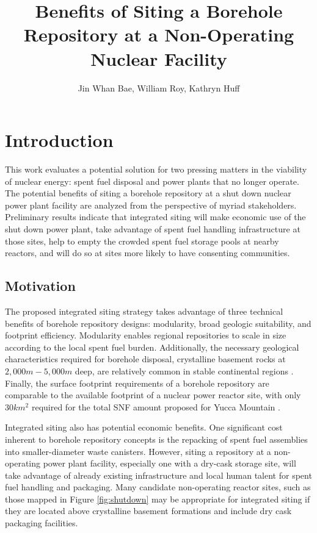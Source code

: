 \documentclass{anstrans}
\title{Benefits of Siting a Borehole Repository at a Non-Operating Nuclear 
Facility}
\author{Jin Whan Bae, William Roy, Kathryn Huff}
\institute{
Dept. of Nuclear Plasma, and Radiological Engineering, University of Illinois at Urbana-Champaign
\and
Urbana, IL
}
\begin{document}
\section{Introduction}

This work evaluates a potential solution for two pressing matters in the viability of
nuclear energy: spent fuel disposal and power plants that no longer operate. The 
potential benefits of siting a borehole repository at a shut down nuclear power 
plant facility are analyzed from the perspective of myriad stakeholders. 
Preliminary results indicate that integrated siting will make economic 
use of the shut down power plant, take advantage of spent fuel handling 
infrastructure at those sites, help to empty the crowded spent 
fuel storage pools at nearby reactors, and will do so at sites more likely to 
have consenting communities.



\subsection{Motivation}
The proposed integrated siting strategy takes advantage of three technical 
benefits of borehole repository designs: modularity, broad geologic 
suitability, and footprint efficiency. Modularity enables regional repositories 
to scale in size according to the local spent fuel burden. 
Additionally, the necessary geological characteristics required for borehole 
disposal, crystalline basement rocks at $2,000m - 5,000m$ deep, are relatively 
common in stable continental regions \cite{arnold_research_2012}. Finally, the 
surface footprint requirements of a borehole repository are comparable to the 
available footprint of a nuclear power reactor site, with only $30km^2$ 
required for the total \gls{SNF} amount proposed for Yucca Mountain 
\cite{brady_deep_2009}.

Integrated siting also has potential economic benefits. One 
significant cost inherent to borehole repository concepts is the repacking of 
spent fuel assemblies into smaller-diameter waste canisters. However, siting a 
repository at a non-operating power plant facility, especially one with a 
dry-cask storage site, will take advantage of already existing infrastructure 
and local human talent for spent fuel handling and packaging. Many candidate 
non-operating reactor sites, such as those mapped in Figure \ref{fig:shutdown} 
may be appropriate for integrated siting if they are located above crystalline 
basement formations and include dry cask packaging facilities.
\end{document}
